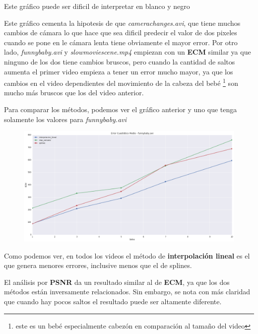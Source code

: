 \vspace{-2em}
\begin{tiny}Este gr\'afico puede ser dificil de interpretar en blanco y negro\end{tiny}
\vspace{2em}

Este gr\'afico cementa la hipotesis de que \textit{camerachanges.avi}, que tiene
muchos cambios de c\'amara lo que hace que sea dificil predecir el valor de dos
pixeles cuando se pone en le c\'amara lenta tiene obviamente el mayor error. Por
otro lado, \textit{funnybaby.avi} y \textit{slowmoviescene.mp4} empiezan con un
\textbf{ECM} similar ya que ninguno de los dos tiene cambios bruscos, pero
cuando la cantidad de saltos aumenta el primer video empieza a tener un error
mucho mayor, ya que los cambios en el video dependientes del movimiento de la
cabeza del beb\'e \footnote{este es un beb\'e especialmente cabez\'on en comparaci\'on al
tama\~no del video} son mucho m\'as bruscos que los del video anterior.

Para comparar los m\'etodos, podemos ver el gr\'afico anterior y uno que tenga
solamente los valores para \textit{funnybaby.avi}

\begin{figure}[H]
\centering
\includegraphics[width=.95\textwidth]{graficos/ecm_funnybaby.png}
\end{figure}

Como podemos ver, en todos los videos el m\'etodo de \textbf{interpolaci\'on
lineal} es el que genera menores errores, inclusive menos que el de splines.

El an\'alisis por \textbf{PSNR} da un resultado similar al de \textbf{ECM}, ya
que los dos m\'etodos est\'an inversamente relacionados. Sin embargo, se nota
con m\'as claridad que cuando hay pocos saltos el resultado puede ser altamente
diferente.

